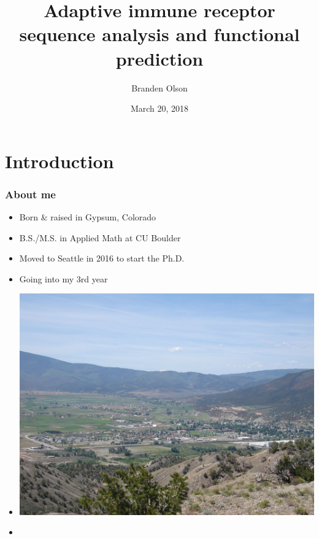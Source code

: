 \documentclass[mathserif,compress]{beamer}
\title[]{Adaptive immune receptor sequence analysis and functional prediction}
\author[]
{Branden Olson}
\date[March 20, 2018]
{March 20, 2018}
\institute[]
{
Fred Hutchinson Cancer Research Center
}
\renewcommand\;{\,}
\begin{document}
\begin{frame}[noframenumbering]
  \titlepage
\end{frame}

\section{Introduction}

\begin{frame}\frametitle{About me}
\begin{center}
\begin{minipage}{0.49\linewidth}
\begin{itemize}
\bigskip
\item Born \& raised in Gypsum, Colorado
\bigskip
\item B.S./M.S. in Applied Math at CU Boulder
\bigskip
\item Moved to Seattle in 2016 to start the Ph.D.
\bigskip
\item Going into my 3rd year
\end{itemize}
\end{minipage}
\begin{minipage}{0.49\linewidth}
\begin{itemize}
\item[]
\includegraphics[width=\linewidth]{Images/Gypsum.jpg}
\bigskip
\item[]
\begin{center}

\end{center}
\end{itemize}
\end{minipage}
\end{center}
\end{frame}
\end{document}

